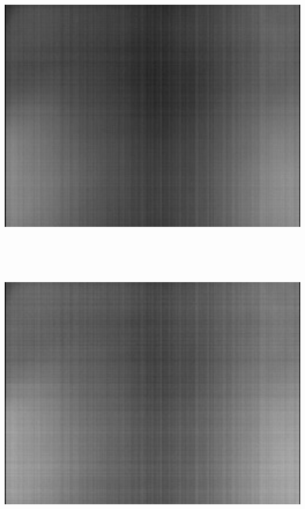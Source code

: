 \begin{center}
\includegraphics[height=12cm]{images/darkavg-5ms}
\end{center} 

\begin{center}
\includegraphics[height=12cm]{images/blackframes-gainx1-offset2047-64ms-01}
\end{center}

